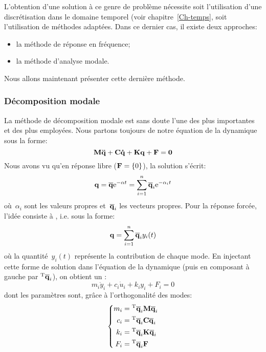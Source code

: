 L'obtention d'une solution à ce genre de problème nécessite soit l'utilisation d'une discrétisation
dans le domaine temporel (voir chapitre~\ref{Ch-temps}, soit l'utilisation de méthodes adaptées.
Dans ce dernier cas, il existe deux approches:
\begin{itemize}
  \item la méthode de réponse en fréquence;
  \item la méthode d'analyse modale.
\end{itemize}
Nous allons maintenant présenter cette dernière méthode.

\medskip
\subsubsection{Décomposition modale}
La méthode de décomposition modale est sans doute l'une des plus importantes et des plus
employées.
\medskipvm
Nous partons toujours de notre équation de la dynamique sous la forme:
\begin{equation} \MM{M}\VV{\ddot{q}}+\MM{C}\VV{\dot{q}}+\MM{K}\VV{q}+\VV{F} = \VV{0} \end{equation}
\medskipvm
Nous avons vu qu'en réponse libre ($\VV{F}=\{0\}$), la solution s'écrit:
\begin{equation} \VV{q} = \VV{\overline{q}} \mathrm{e}^{-\alpha t} = \dsum_{i=1}^n \VV{\overline{q}}_i \mathrm{e}^{-\alpha_i t} \end{equation}
où~$\alpha_i$ sont les valeurs propres et~$\VV{\overline{q}}_i$ les vecteurs propres.
\medskipvm
Pour la réponse forcée, l'idée consiste à , i.e. sous la forme:
\begin{equation} \VV{q} = \dsum_{i=1}^n \VV{\overline{q}}_i y_i(t) \end{equation}
où la quantité~$y_i(t)$ représente la contribution de chaque mode.
\medskipvm
En injectant cette forme de solution dans l'équation de la dynamique (puis en composant à gauche par
${}^\mathrm{T}\mathbf{\overline{q}}_i$), on obtient un :
\begin{equation} m_i\ddot{y}_i+c_i\dot{u}_i+k_iy_i+F_i = 0 \end{equation}
dont les paramètres sont, grâce à l'orthogonalité des modes:
\begin{equation}\left\{
\begin{aligned}
	m_i &= \LL{\overline{q}}_i\MM{M}\VV{\overline{q}}_i\\
	c_i &= \LL{\overline{q}}_i\MM{C}\VV{\overline{q}}_i\\
	k_i &= \LL{\overline{q}}_i\MM{K}\VV{\overline{q}}_i\\
	F_i &= \LL{\overline{q}}_i\VV{F}
\end{aligned}
\right.\end{equation}
